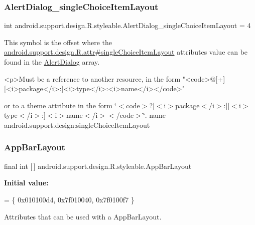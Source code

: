 \subsubsection{\texorpdfstring{Alert\+Dialog\+\_\+single\+Choice\+Item\+Layout}{AlertDialog\_singleChoiceItemLayout}}
{\footnotesize\ttfamily int android.\+support.\+design.\+R.\+styleable.\+Alert\+Dialog\+\_\+single\+Choice\+Item\+Layout = 4\hspace{0.3cm}{\ttfamily [static]}}

This symbol is the offset where the \hyperlink{classandroid_1_1support_1_1design_1_1R_1_1attr_a60f49df56d4291da99236ac0f3e4279c}{android.\+support.\+design.\+R.\+attr\#single\+Choice\+Item\+Layout} attribute\textquotesingle{}s value can be found in the \hyperlink{classandroid_1_1support_1_1design_1_1R_1_1styleable_aeccb758d25f6e242e6f3a23f3873ec21}{Alert\+Dialog} array.

\begin{DoxyVerb}      <p>Must be a reference to another resource, in the form "<code>@[+][<i>package</i>:]<i>type</i>:<i>name</i></code>"
\end{DoxyVerb}
 or to a theme attribute in the form \char`\"{}$<$code$>$?\mbox{[}$<$i$>$package$<$/i$>$\+:\mbox{]}\mbox{[}$<$i$>$type$<$/i$>$\+:\mbox{]}$<$i$>$name$<$/i$>$$<$/code$>$\char`\"{}.  name android.\+support.\+design\+:single\+Choice\+Item\+Layout \mbox{\label{classandroid_1_1support_1_1design_1_1R_1_1styleable_ad4af8881949a584d986f4bfadb3e8482}} 
\subsubsection{\texorpdfstring{App\+Bar\+Layout}{AppBarLayout}}
{\footnotesize\ttfamily final int \mbox{[}$\,$\mbox{]} android.\+support.\+design.\+R.\+styleable.\+App\+Bar\+Layout\hspace{0.3cm}{\ttfamily [static]}}

{\bfseries Initial value\+:}
\begin{DoxyCode}
= \{
            0x010100d4, 0x7f010040, 0x7f0100f7
        \}
\end{DoxyCode}
Attributes that can be used with a App\+Bar\+Layout. 

